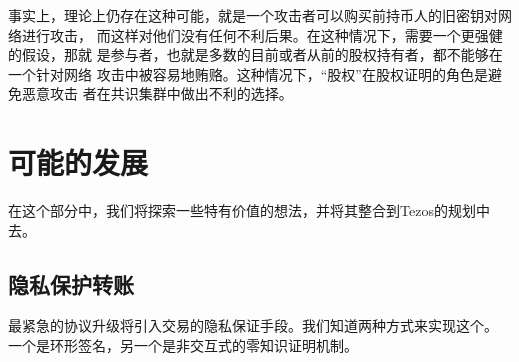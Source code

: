 \documentclass[letterpaper]{article}
\begin{document}
事实上，理论上仍存在这种可能，就是一个攻击者可以购买前持币人的旧密钥对网络进行攻击，
而这样对他们没有任何不利后果。在这种情况下，需要一个更强健的假设，那就
是参与者，也就是多数的目前或者从前的股权持有者，都不能够在一个针对网络
攻击中被容易地贿赂。这种情况下，``股权''在股权证明的角色是避免恶意攻击
者在共识集群中做出不利的选择。


\section{可能的发展}

在这个部分中，我们将探索一些特有价值的想法，并将其整合到Tezos的规划中
去。

\subsection{隐私保护转账}
最紧急的协议升级将引入交易的隐私保证手段。我们知道两种方式来实现这个。
一个是环形签名，另一个是非交互式的零知识证明机制。

\end{document}
